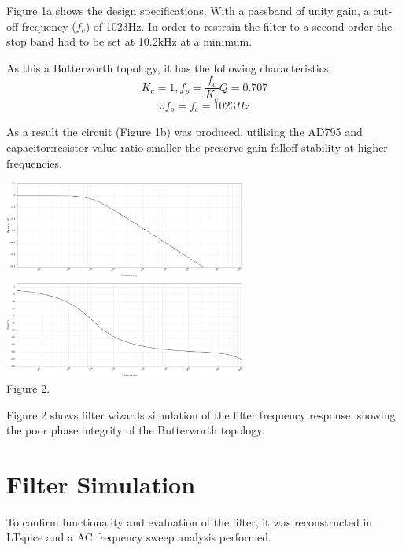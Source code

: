 \documentclass[11pt]{article}
\begin{document}
\begin{preview}
Figure 1a shows the design specifications. With a passband of unity gain, a cut-off frequency ($f_c$) of 1023Hz. In order to restrain the filter to a second order the stop band had to be set at 10.2kHz at a minimum.

As this a Butterworth topology, it has the following characteristics:
$$K_c = 1, f_p = \frac{f_c}{K_c} Q = 0.707$$
$$\therefore f_p = f_c = 1023Hz$$

As a result the circuit (Figure 1b) was produced, utilising the AD795 and capacitor:resistor value ratio smaller the preserve gain falloff stability at higher frequencies.

\begin{center}
        \includegraphics[width=0.6\textwidth]{images/wizard_mag.png}\\
        \vspace*{10mm}
        \includegraphics[width=0.6\textwidth]{images/wizard_phase.png}\\
        Figure 2.
\end{center}

Figure 2 shows filter wizards simulation of the filter frequency response, showing the poor phase integrity of the Butterworth topology. 


\section{Filter Simulation}
To confirm functionality and evaluation of the filter, it was reconstructed in LTspice and a AC frequency sweep analysis performed.


\end{preview}
\end{document}

